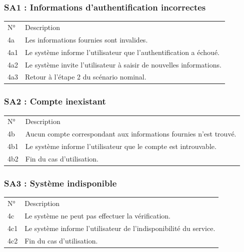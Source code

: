 \documentclass[
]{book}
\begin{document}
\hypertarget{sa1-informations-dauthentification-incorrectes}{%
\subsubsection{SA1 : Informations d'authentification
incorrectes}\label{sa1-informations-dauthentification-incorrectes}}

\begin{longtable}[]{@{}ll@{}}
\toprule
\endhead
N° & Description \\
4a & Les informations fournies sont invalides. \\
4a1 & Le système informe l'utilisateur que l'authentification a
échoué. \\
4a2 & Le système invite l'utilisateur à saisir de nouvelles
informations. \\
4a3 & Retour à l'étape 2 du scénario nominal. \\
\bottomrule
\end{longtable}

\hypertarget{sa2-compte-inexistant}{%
\subsubsection{SA2 : Compte inexistant}\label{sa2-compte-inexistant}}

\begin{longtable}[]{@{}ll@{}}
\toprule
\endhead
N° & Description \\
4b & Aucun compte correspondant aux informations fournies n'est
trouvé. \\
4b1 & Le système informe l'utilisateur que le compte est introuvable. \\
4b2 & Fin du cas d'utilisation. \\
\bottomrule
\end{longtable}

\hypertarget{sa3-systuxe8me-indisponible}{%
\subsubsection{SA3 : Système
indisponible}\label{sa3-systuxe8me-indisponible}}

\begin{longtable}[]{@{}ll@{}}
\toprule
\endhead
N° & Description \\
4c & Le système ne peut pas effectuer la vérification. \\
4c1 & Le système informe l'utilisateur de l'indisponibilité du
service. \\
4c2 & Fin du cas d'utilisation. \\
\bottomrule
\end{longtable}
\end{document}

